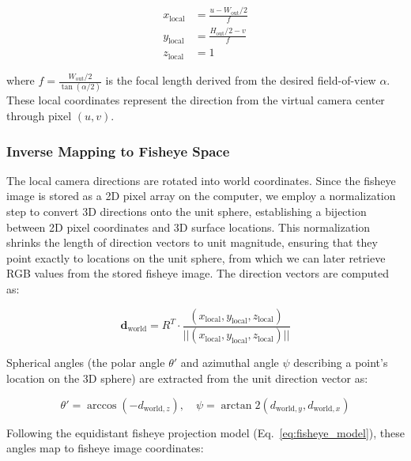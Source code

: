 \documentclass[twocolumn]{svjour3}          %
\begin{document}
\begin{equation}
	\begin{aligned}
		x_{\text{local}} &= \frac{u - W_{\text{out}}/2}{f} \\
		y_{\text{local}} &= \frac{H_{\text{out}}/2 - v}{f} \\
		z_{\text{local}} &= 1
	\end{aligned}
	\label{eq:perspective_coords}
\end{equation}

where $f = \frac{W_{\text{out}}/2}{\tan(\alpha/2)}$ is the focal length derived from the desired field-of-view $\alpha$. These local coordinates represent the direction from the virtual camera center through pixel $(u, v)$.

\subsubsection{Inverse Mapping to Fisheye Space}
\label{sec:inverse_mapping}

The local camera directions are rotated into world coordinates. Since the fisheye image is stored as a 2D pixel array on the computer, we employ a normalization step to convert 3D directions onto the unit sphere, establishing a bijection between 2D pixel coordinates and 3D surface locations. This normalization shrinks the length of direction vectors to unit magnitude, ensuring that they point exactly to locations on the unit sphere, from which we can later retrieve RGB values from the stored fisheye image. The direction vectors are computed as:

\begin{equation}
	\mathbf{d}_{\text{world}} = R^T \cdot \frac{(x_{\text{local}}, y_{\text{local}}, z_{\text{local}})}{||(x_{\text{local}}, y_{\text{local}}, z_{\text{local}})||}
	\label{eq:world_dir}
\end{equation}

Spherical angles (the polar angle $\theta'$ and azimuthal angle $\psi$ describing a point's location on the 3D sphere) are extracted from the unit direction vector as:

\begin{equation}
	\theta' = \arccos(-d_{\text{world},z}), \quad \psi = \arctan2(d_{\text{world},y}, d_{\text{world},x})
	\label{eq:spherical_angles}
\end{equation}

Following the equidistant fisheye projection model (Eq.~\ref{eq:fisheye_model}), these angles map to fisheye image coordinates:
\end{document}

